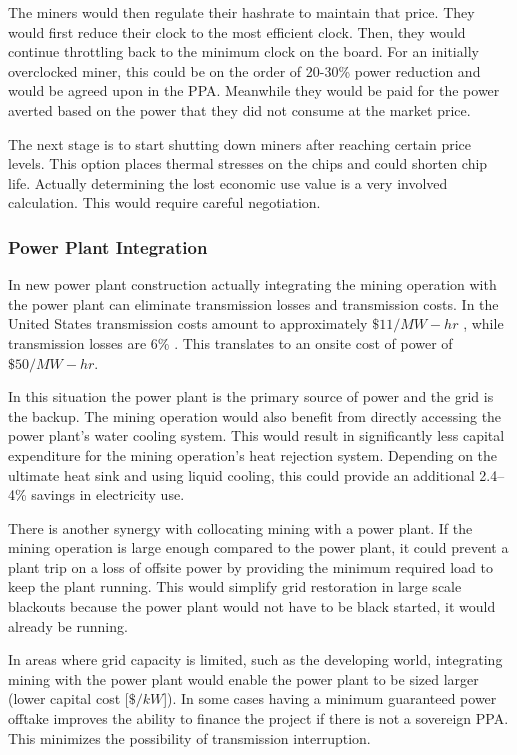 \documentclass[runningheads]{llncs}
\begin{document}
The miners would then regulate their hashrate to maintain that price.
They would first reduce their clock to the most efficient clock.
Then, they would continue throttling back to the minimum clock on the board.
For an initially overclocked miner, this could be on the order of 20-30\% power reduction and would be agreed upon in the PPA.
Meanwhile they would be paid for the power averted based on the power that they did not consume at the market price.

The next stage is to start shutting down miners after reaching certain price levels.
This option places thermal stresses on the chips and could shorten chip life.
Actually determining the lost economic use value is a very involved calculation.
This would require careful negotiation.

\subsubsection{Power Plant Integration}
In new power plant construction actually integrating the mining operation with the power plant can eliminate transmission losses and transmission costs.
In the United States transmission costs amount to approximately $\$11/MW-hr$ \cite{ier2021transmission}, while transmission losses are 6\% \cite{worldbank2021losses}.
This translates to an onsite cost of power of $\$50/MW-hr$.

In this situation the power plant is the primary source of power and the grid is the backup.
The mining operation would also benefit from directly accessing the power plant's water cooling system.
This would result in significantly less capital expenditure for the mining operation's heat rejection system.
Depending on the ultimate heat sink and using liquid cooling, this could provide an additional 2.4--4\% savings in electricity use.

There is another synergy with collocating mining with a power plant.
If the mining operation is large enough compared to the power plant, it could prevent a plant trip on a loss of offsite power by providing the minimum required load to keep the plant running.
This would simplify grid restoration in large scale blackouts because the power plant would not have to be black started, it would already be running.

In areas where grid capacity is limited, such as the developing world, integrating mining with the power plant would enable the power plant to be sized larger (lower capital cost [$\$/kW$]).
In some cases having a minimum guaranteed power offtake improves the ability to finance the project if there is not a sovereign PPA.
This minimizes the possibility of transmission interruption.
\end{document}
